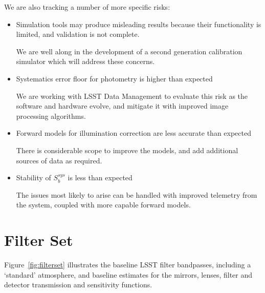 \documentclass[12pt,preprint]{aastex}
\begin{document}
We are also tracking a number of more specific risks:

\begin{itemize}
\item {Simulation tools may produce misleading results because their functionality is limited, and
validation is not complete.}  

We are well along in the development of a second generation calibration
simulator which will address these concerns.

\item {Systematics error floor for photometry is higher than expected}

We are working with LSST Data Management to evaluate this risk as the software and hardware evolve,
and mitigate it with improved image processing algorithms.

\item {Forward models for illumination correction are less accurate than expected}

There is considerable scope to improve the models, and add additional sources of data as required.

\item {Stability of $S_b^{sys}$ is less than expected}

The issues most likely to arise can be handled with improved telemetry from the system, coupled with 
more capable forward models.

\end{itemize}





\appendix

\newpage
\section{Filter Set}

Figure~\ref{fig:filterset} illustrates the baseline LSST filter
bandpasses, including a `standard' atmosphere, and baseline estimates
for the mirrors, lenses, filter and detector transmission and
sensitivity functions. 
\end{document}
